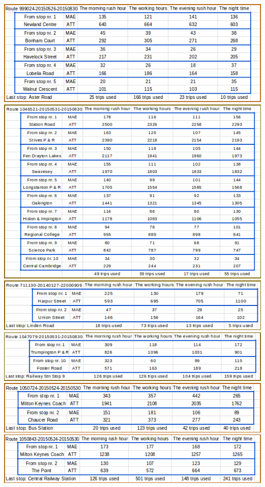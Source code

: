 \documentclass[12pt,a4paper,oneside,openright]{report}
\begin{document}
\includegraphics[width=\textwidth]{figs/table_of_999024.png}
\includegraphics[width=\textwidth]{figs/table_of_1046521.png}
\includegraphics[width=\textwidth]{figs/table_of_711130.png}
\includegraphics[width=\textwidth]{figs/table_of_1047079.png}
\includegraphics[width=\textwidth]{figs/table_of_1050724.png}
\includegraphics[width=\textwidth]{figs/table_of_1050843.png}
\end{document}
